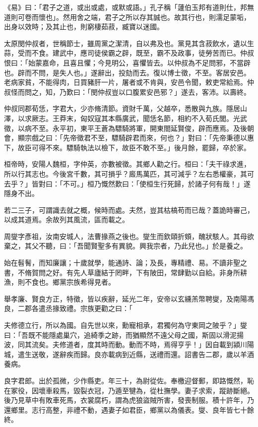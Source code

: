 
\begin{pinyinscope}
《易》曰：「君子之道，或出或處，或默或語。」孔子稱「蘧伯玉邦有道則仕，邦無道則可卷而懷也」。然用舍之端，君子之所以存其誠也。故其行也，則濡足蒙垢，出身以效時；及其止也，則窮棲茹菽，臧寶以迷國。

太原閔仲叔者，世稱節士，雖周黨之潔清，自以弗及也。黨見其含菽飲水，遺以生蒜，受而不食。建武中，應司徒侯霸之辟，既至，霸不及政事，徒勞苦而已。仲叔恨曰：「始蒙嘉命，且喜且懼；今見明公，喜懼皆去。以仲叔為不足問邪，不當辟也。辟而不問，是失人也。」遂辭出，投劾而去。復以博士徵，不至。客居安邑。老病家貧，不能得肉，日買豬肝一片，屠者或不肯與，安邑令聞，敕吏常給焉。仲叔怪而問之，知，乃歎曰：「閔仲叔豈以口腹累安邑邪？」遂去，客沛。以壽終。

仲叔同郡荀恁，字君大，少亦脩清節。資財千萬，父越卒，悉散與九族。隱居山澤，以求厥志。王莽末，匈奴寇其本縣廣武，聞恁名節，相約不入荀氏閭。光武徵，以病不至。永平初，東平王蒼為驃騎將軍，開東閤延賢俊，辟而應焉。及後朝會，顯宗戲之曰：「先帝徵君不至，驃騎辟君而來，何也？」對曰：「先帝秉德以惠下，故臣可得不來。驃騎執法以檢下，故臣不敢不至。」後月餘，罷歸，卒於家。

桓帝時，安陽人魏桓，字仲英，亦數被徵。其鄉人勸之行。桓曰：「夫干祿求進，所以行其志也。今後宮千數，其可損乎？廄馬萬匹，其可減乎？左右悉權豪，其可去乎？」皆對曰：「不可。」桓乃慨然歎曰：「使桓生行死歸，於諸子何有哉！」遂隱身不出。

若二三子，可謂識去就之概，候時而處。夫然，豈其枯槁苟而已哉？蓋詭時審己，以成其道焉。余故列其風流，區而載之。

周燮字彥祖，汝南安城人，法曹掾燕之後也。燮生而欽頤折頞，醜狀駭人。其母欲棄之，其父不聽，曰：「吾聞賢聖多有異貌。興我宗者，乃此兒也。」於是養之。

始在髫鬌，而知廉讓；十歲就學，能通詩、論；及長，專精禮、易。不讀非聖之書，不脩賀問之好。有先人草廬結于罔畔，下有陂田，常肆勤以自給。非身所耕漁，則不食也。鄉黨宗族希得見者。

舉孝廉、賢良方正，特徵，皆以疾辭，延光二年，安帝以玄纁羔幣聘燮，及南陽馮良，二郡各遣丞掾致禮。宗族更勸之曰：「

夫修德立行，所以為國。自先世以來，勳寵相承，君獨何為守東岡之陂乎？」燮曰：「吾既不能隱處巢穴，追綺季之跡，而猶顯然不遠父母之國，斯固以滑泥揚波，同其流矣。夫修道者，度其時而動。動而不時，焉得亨乎！」因自載到潁川陽城，遣生送敬，遂辭疾而歸。良亦載病到近縣，送禮而還。詔書告二郡，歲以羊酒養病。

良字君郎。出於孤微，少作縣吏。年三十，為尉從佐。奉檄迎督郵，即路慨然，恥在冢役，因壞車殺馬，毀裂衣冠，乃遁至犍為，從杜撫學。妻子求索，蹤跡斷絕。後乃見草中有敗車死馬，衣裳腐朽，謂為虎狼盜賊所害，發喪制服。積十許年，乃還鄉里。志行高整，非禮不動，遇妻子如君臣，鄉黨以為儀表。燮、良年皆七十餘終。


\end{pinyinscope}
